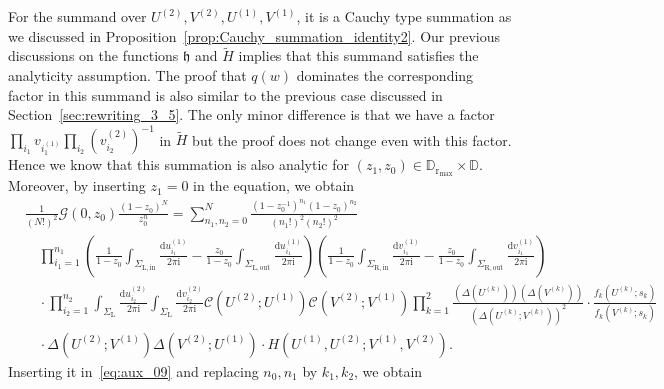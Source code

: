 \documentclass{article}
\numberwithin{equation}{section}
\newcommand{\Ch}{\mathcal{C}}
\newcommand{\ddbar}[2]{\frac{{\mathrm d}#1}{2\pi {\mathrm i}#2}}
\newcommand{\inn}{\mathrm{in}}
\newcommand{\LL}{\mathrm{L}}
\newcommand{\out}{\mathrm{out}}
\newcommand{\RR}{\mathrm{R}}
\newcommand{\rr}{\mathrm{r_{max}}}
\begin{document}
For the summand over $U^{(2)},V^{(2)},U^{(1)},V^{(1)}$, it is a Cauchy type summation as we discussed in Proposition~\ref{prop:Cauchy_summation_identity2}. Our previous discussions on the functions $\mathfrak{h}$ and $\tilde H$ implies that this summand satisfies the analyticity assumption. The proof that $q(w)$ dominates the corresponding factor in this summand is also similar to the previous case discussed in Section~\ref{sec:rewriting_3_5}. The only minor difference is that we have a factor $\prod_{i_1}v_{i_1^{(1)}}\prod_{i_2}(v_{i_2}^{(2)})^{-1}$ in $\tilde H$ but the proof does not change even with this factor. Hence we know that this summation is also analytic for $(z_1,z_0)\in\mathbb{D}_\rr\times\mathbb{D}$. Moreover, by inserting $z_1=0$ in the equation, we obtain
\begin{equation}
	\label{eq:aux_08}
	\begin{split}
		&\frac{1}{(N!)^2}\mathcal{G}(0,z_0)\frac{(1-z_0)^N}{z_0^n}=\sum_{n_1,n_2=0}^N \frac{(1-z_0^{-1})^{n_1}
			(1-z_0)^{n_2}}{(n_1!)^2(n_2!)^2}\\
		&\quad \prod_{i_1=1}^{n_1}     
		\left(  \frac{1}{1-{z_0}} \int_{\Sigma_{\LL,\inn}} 	    
	\ddbar{u^{(1)}_{i_1}}{}   
-\frac{{z_0}}{1-{z_0}} \int_{\Sigma_{\LL,\out}} \ddbar{u^{(1)}_{i_1}}{}
\right)
\left(  \frac{1}{1-{z_0}}  \int_{\Sigma_{\RR,\inn}}  
\ddbar{v^{(1)}_{i_1}}{}
-\frac{{z_0}}{1-{z_0}}  \int_{\Sigma_{\RR,\out}}
\ddbar{v^{(1)}_{i_1}}{}
\right)\\
&\quad \cdot 
\prod_{i_2=1}^{n_2}  
\int_{\Sigma_\LL} \ddbar{u^{(2)}_{i_2}}{} 
\int_{\Sigma_\LL} \ddbar{v^{(2)}_{i_2}}{} 
\Ch(U^{(2)};U^{(1)})\Ch(V^{(2)};V^{(1)}) \prod_{k=1}^2
\frac{(\Delta(U^{(k)}))(\Delta(V^{(k)}))}
{(\Delta(U^{(k)};V^{(k)}))^2}
\cdot
\frac{f_k(U^{(k)};s_k)}{f_k(V^{(k)};s_k)}  \\
			&\quad \cdot 
		{
			\Delta(U^{(2)};V^{(1)}) \Delta (V^{(2)}; U^{(1)})
		}        
		\cdot
		{
			 H(U^{(1)},U^{(2)};V^{(1)},V^{(2)}).
		}		
	\end{split}
\end{equation}
Inserting it in~\eqref{eq:aux_09} and replacing $n_0,n_1$ by $k_1,k_2$, we obtain
\end{document}
